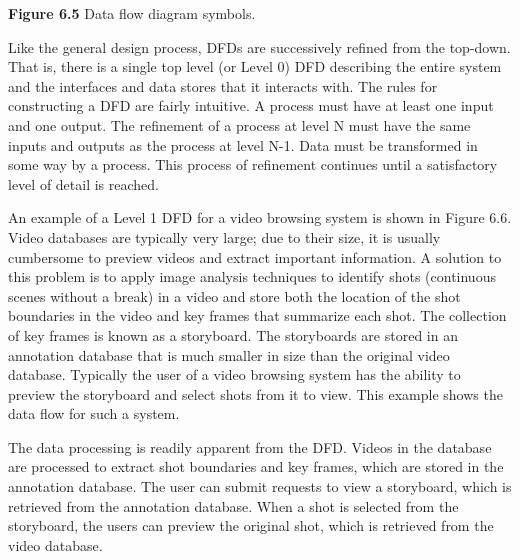 \textbf{Figure 6.5} Data flow diagram symbols.

Like the general design process, DFDs are successively refined from the
top-down. That is, there is a single top level (or Level 0) DFD
describing the entire system and the interfaces and data stores that it
interacts with. The rules for constructing a DFD are fairly intuitive. A
process must have at least one input and one output. The refinement of a
process at level N must have the same inputs and outputs as the process
at level N-1. Data must be transformed in some way by a process. This
process of refinement continues until a satisfactory level of detail is
reached.

An example of a Level 1 DFD for a video browsing system is shown in
Figure 6.6. Video databases are typically very large; due to their size,
it is usually cumbersome to preview videos and extract important
information. A solution to this problem is to apply image analysis
techniques to identify shots (continuous scenes without a break) in a
video and store both the location of the shot boundaries in the video
and key frames that summarize each shot. The collection of key frames is
known as a storyboard. The storyboards are stored in an annotation
database that is much smaller in size than the original video database.
Typically the user of a video browsing system has the ability to preview
the storyboard and select shots from it to view. This example shows the
data flow for such a system.

The data processing is readily apparent from the DFD. Videos in the
database are processed to extract shot boundaries and key frames, which
are stored in the annotation database. The user can submit requests to
view a storyboard, which is retrieved from the annotation database. When
a shot is selected from the storyboard, the users can preview the
original shot, which is retrieved from the video database.

